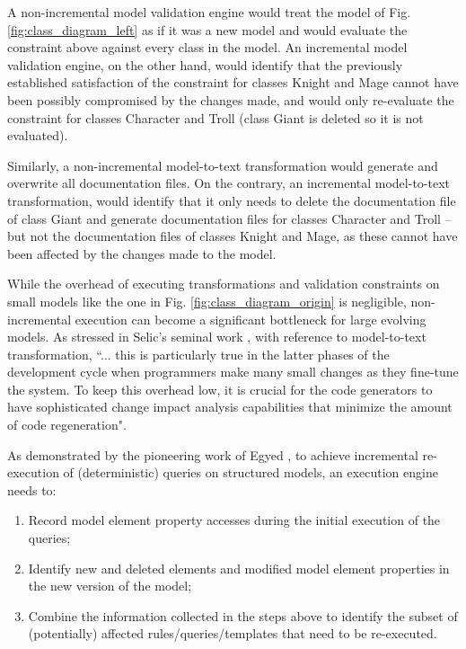 A non-incremental model validation engine would treat the model of 
Fig. \ref{fig:class_diagram_left} as if it was a new model and would evaluate 
the constraint above against every class in the model. 
An incremental model validation engine, on the other hand, would identify 
that the previously established satisfaction of the constraint for classes 
\textsf{Knight} and \textsf{Mage} cannot have been possibly compromised by the changes made, and would only re-evaluate the constraint for classes \textsf{Character} and \textsf{Troll} (class \textsf{Giant} is deleted so it is not evaluated). 

Similarly, a non-incremental model-to-text transformation would generate 
and overwrite all documentation files. On the contrary, an 
incremental model-to-text transformation, would identify that it only needs to delete the documentation file of class \textsf{Giant} and generate documentation files for classes \textsf{Character} and \textsf{Troll} -- but not the documentation files of classes \textsf{Knight} and \textsf{Mage}, as these cannot have been affected by the changes made to the model.

While the overhead of executing transformations and validation constraints 
on small models like the one in Fig. \ref{fig:class_diagram_origin} is negligible, non-incremental execution can become a significant bottleneck for large evolving models. As stressed in Selic's seminal work \cite{selic2003pragmatics}, with reference to model-to-text transformation, ``... \textsf{this is particularly true in the latter phases of the development cycle when programmers make many small changes as they fine-tune the system. To keep this overhead low, it is crucial for the code generators to have sophisticated change impact analysis capabilities that minimize the amount of code regeneration}".

As demonstrated by the pioneering work of Egyed \cite{egyed2011automatically}, 
to achieve incremental re-execution of (deterministic) queries on 
structured models, an execution engine needs to:

\begin{enumerate}
    \item Record model element property accesses during the initial execution of the queries;
    \item Identify new and deleted elements and modified model element properties in the new version of the model;
    \item Combine the information collected in the steps above to identify the subset of (potentially) affected rules/queries/templates that need to be re-executed.
\end{enumerate}

